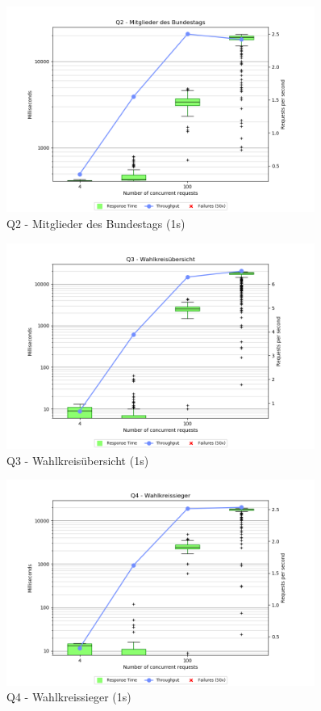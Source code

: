 \documentclass[a4paper]{scrreprt}
\begin{document}
\begin{figure}[h]
\centering
\includegraphics[width=0.9\textwidth]{images/plots_1s/Q2}
\caption {Q2 - Mitglieder des Bundestags (1s)}
\end{figure}

\begin{figure}[h]
\centering
\includegraphics[width=0.9\textwidth]{images/plots_1s/Q3}
\caption {Q3 - Wahlkreisübersicht (1s)}
\end{figure}

\begin{figure}[h]
\centering
\includegraphics[width=0.9\textwidth]{images/plots_1s/Q4}
\caption {Q4 - Wahlkreissieger (1s)}
\end{figure}
\end{document}
